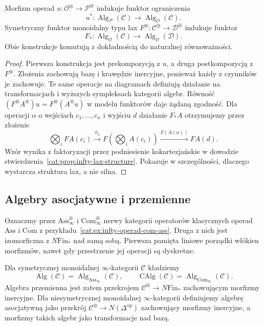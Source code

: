 \begin{stwierdzenie}\label{cat:prop:infty-algebra-change}
Morfizm operad $u:\mathcal O^\otimes\to\mathcal P^\otimes$ indukuje funktor ograniczenia
\[
 u^*:\operatorname{Alg}_{\mathcal P}(\mathcal C)
 \longrightarrow\operatorname{Alg}_{\mathcal O}(\mathcal C).
\]
Symetryczny funktor monoidalny typu lax $F^\otimes:\mathcal C^\otimes\to\mathcal D^\otimes$ indukuje funktor
\[
 F_*:\operatorname{Alg}_{\mathcal O}(\mathcal C)
 \longrightarrow\operatorname{Alg}_{\mathcal O}(\mathcal D).
\]
Obie konstrukcje komutują z dokładnością do naturalnej równoważności.
\end{stwierdzenie}
\begin{proof}
Pierwsza konstrukcja jest prekompozycją z $u$, a druga postkompozycją z $F^\otimes$. Złożenia zachowują bazę i krawędzie inercyjne, ponieważ każdy z czynników je zachowuje. Te same operacje na diagramach definiują działanie na transformacjach i wyższych sympleksach kategorii algebr. Równość $(F^\otimes A^\otimes)u=F^\otimes(A^\otimes u)$ w modelu funktorów daje żądaną zgodność. Dla operacji $\alpha$ o wejściach $c_1,\ldots,c_n$ i wyjściu $d$ działanie $F_*A$ otrzymujemy przez złożenie
\[
 \bigotimes_i FA(c_i)
 \xrightarrow{\phi_n} F\left(\bigotimes_i A(c_i)\right)
 \xrightarrow{F(A(\alpha))} FA(d).
\]
Wzór wynika z faktoryzacji przez podniesienie kokartezjańskie w dowodzie stwierdzenia~\ref{cat:prop:infty-lax-structure}. Pokazuje w szczególności, dlaczego wystarcza struktura lax, a nie silna.
\end{proof}

\subsection{Algebry asocjatywne i przemienne}

Oznaczmy przez $\mathrm{Ass}^\otimes_\infty$ i $\mathrm{Com}^\otimes_\infty$ nerwy kategorii operatorów klasycznych operad $\mathrm{Ass}$ i $\mathrm{Com}$ z przykładu~\ref{cat:ex:infty-operad-com-ass}. Druga z nich jest izomorficzna z $N\mathrm{Fin}_*$ nad samą sobą. Pierwsza pamięta liniowe porządki włókien morfizmów, nawet gdy przestrzenie jej operacji są dyskretne.

\begin{definicja}\label{cat:def:infty-ass-com-algebra}
Dla symetrycznej monoidalnej $\infty$-kategorii $\mathcal C$ kładziemy
\[
 \operatorname{Alg}(\mathcal C)
 =\operatorname{Alg}_{\mathrm{Ass}_\infty}(\mathcal C),
 \qquad
 \operatorname{CAlg}(\mathcal C)
 =\operatorname{Alg}_{\mathrm{Com}_\infty}(\mathcal C).
\]
Algebra przemienna jest zatem przekrojem $\mathcal C^\otimes\to N\mathrm{Fin}_*$ zachowującym morfizmy inercyjne. Dla niesymetrycznej monoidalnej $\infty$-kategorii definiujemy algebrę asocjatywną jako przekrój $\mathcal C^\otimes\to N(\Delta^{\mathrm{op}})$ zachowujący morfizmy inercyjne, a morfizmy takich algebr jako transformacje nad bazą.
\end{definicja}

